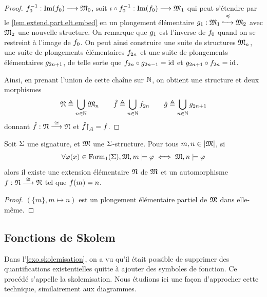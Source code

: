 \begin{proof}
\begin{minipage}{0.65\textwidth}
    $f_0^{-1} : \displaystyle \operatorname{Im}(f_0) \longrightarrow \mathfrak{M}_0$, soit
    $\iota\circ f_0^{-1} : \displaystyle \operatorname{Im}(f_0) \longrightarrow \mathfrak{M}_1$ qui peut
    s'étendre par le \cref{lem.extend.part.elt.embed} en un plongement
    élémentaire $g_1 : \displaystyle \mathfrak{M}_1 \overset{\preccurlyeq}{\xhookrightarrow{\quad}} \mathfrak{M}_2$ avec
    $\mathfrak{M}_2$ une nouvelle structure. On remarque que
    $g_1$ est l'inverse de $f_0$ quand on se restreint à
    l'image de $f_0$. On peut ainsi construire une suite de structures
    $\mathfrak{M}_n$, une suite de plongements élémentaires $f_{2n}$ et une
    suite de plongements élémentaires $g_{2n+1}$, de telle sorte que
    $f_{2n}\circ g_{2n-1} = \operatorname{id}$ et
    $g_{2n+1}\circ f_{2n}=\operatorname{id}$.
  \end{minipage}

  \vspace{5pt}
  Ainsi, en prenant l'union de cette chaîne sur $\mathbb N$, on obtient une
  structure et deux morphismes
  \[\mathfrak{N}\triangleq\bigcup_{n \in \mathbb N}\mathfrak{M}_n\qquad
  \hat{f}\triangleq \bigcup_{n \in \mathbb N}f_{2n}\qquad
  \hat{g}\triangleq\bigcup_{n \in \mathbb N}g_{2n+1}\]
  donnant $\hat{f} : \displaystyle \mathfrak{N} \overset{\cong}{\longrightarrow} \mathfrak{N}$ et
  $\hat{f}\mathbin{\upharpoonright}_{A} = f$.
\end{proof}

\begin{corollary}\label{cor.typ1}
  Soit $\Sigma$ une signature, et $\mathfrak{M}$ une $\Sigma$-structure. Pour tous
  $m,n \in \left\vert \mathfrak{M}\right\vert$, si
  \[\forall \varphi(x)\in\operatorname{Form}_1(\Sigma), \mathfrak{M},m\models\varphi \iff
  \mathfrak{M},n\models\varphi\]
  alors il existe une extension élémentaire $\mathfrak{N}$ de $\mathfrak{M}$  et un
  automorphisme $f : \displaystyle \mathfrak{N} \overset{\cong}{\longrightarrow} \mathfrak{N}$ tel que
  $f(m) = n$.
\end{corollary}

\begin{proof}
  $(\{m\},m\mapsto n)$ est un plongement élémentaire partiel de $\mathfrak{M}$
  dans elle-même.
\end{proof}

\subsection{Fonctions de Skolem}

Dans l'\cref{exo.skolemisation}, on a vu qu'il était possible de supprimer
des quantifications existentielles quitte à ajouter des symboles de fonction.
Ce procédé s'appelle la skolemisation. Nous étudions ici une façon d'approcher
cette technique, similairement aux diagrammes.

